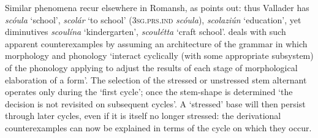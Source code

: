 \documentclass[output=paper,
modfonts
]{LSP/langsci}
\begin{document}
Similar phenomena recur elsewhere in Romansh, as \citet[20]{anderson2013stem}
points out: thus Vallader has \emph{scóula} `school', \emph{scolár} `to
school' (\textsc{3sg.prs.ind} \emph{scóula}), \emph{scolaziún}
`education', yet diminutives \emph{scoulína} `kindergarten',
\emph{scoulétta} `craft school'. \citet[28]{anderson2011a} deals with such
apparent counterexamples by assuming an architecture of the grammar in
which morphology and phonology `interact cyclically (with some
appropriate subsystem) of the phonology applying to adjust the results
of each stage of morphological elaboration of a form'. The selection of
the stressed or unstressed stem alternant operates only during the
`first cycle'; once the stem-shape is determined `the decision is not
revisited on subsequent cycles'. A `stressed' base will then persist
through later cycles, even if it is itself no longer stressed: the
derivational counterexamples can now be explained in terms of the cycle
on which they occur.
\end{document}
